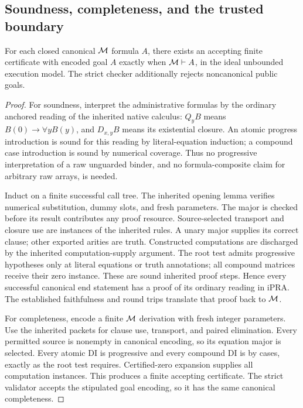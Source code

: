 \subsection{Soundness, completeness, and the trusted boundary}

\begin{theorem}
For each closed canonical $\mathcal M$ formula $A$, there exists an
accepting finite certificate with encoded goal $A$ exactly when
$\mathcal M\vdash A$, in the ideal unbounded execution model.
The strict checker additionally rejects noncanonical public goals.
\end{theorem}
\begin{proof}
For soundness, interpret the administrative formulas by the ordinary
anchored reading of the inherited native calculus: $Q_yB$ means
$B(0)\to\forall yB(y)$, and $D_{x,y}B$ means its existential closure.
An atomic progress introduction is sound for this reading by
literal-equation induction; a compound case introduction is sound
by numerical coverage.  Thus no progressive interpretation of a raw
unguarded binder, and no formula-composite claim for arbitrary raw
arrays, is needed.

Induct on a finite successful call tree.  The inherited opening
lemma verifies numerical substitution, dummy slots, and fresh
parameters.  The major is checked before its result contributes
any proof resource.  Source-selected transport and closure use are
instances of the inherited rules.  A unary major supplies its
correct clause; other exported arities are truth.  Constructed
computations are discharged by the inherited computation-supply
argument.  The root test admits progressive hypotheses only at
literal equations or truth annotations; all compound matrices receive
their zero instance.  These are sound inherited proof steps.  Hence
every successful canonical end statement has a proof of its ordinary
reading in iPRA.  The established faithfulness and round trips
translate that proof back to $\mathcal M$.

For completeness, encode a finite $\mathcal M$ derivation with fresh
integer parameters.  Use the inherited packets for clause use,
transport, and paired elimination.  Every permitted source is
nonempty in canonical encoding, so its equation major is selected.
Every atomic DI is progressive and every compound DI is by cases,
exactly as the root test requires.  Certified-zero expansion supplies
all computation instances.  This produces a finite accepting
certificate.  The strict validator accepts the stipulated goal
encoding, so it has the same canonical completeness.
\end{proof}

